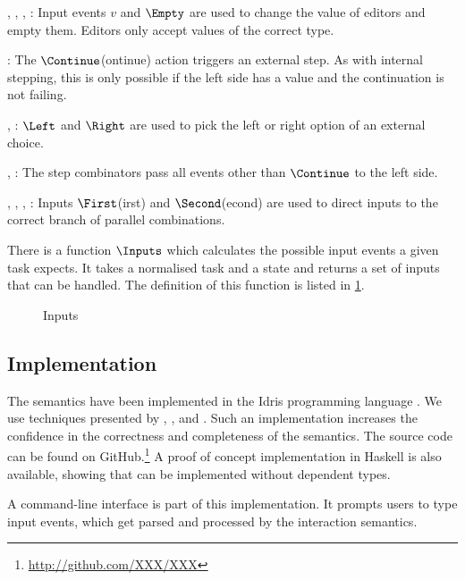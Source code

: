 ,
,
,
:
Input events $v$ and $\Empty$ are used to change the value of editors and empty them.
Editors only accept values of the correct type.

:
The $\Continue$(ontinue) action triggers an external step.
As with internal stepping, this is only possible if the left side has a value and the continuation is not failing.

,
:
$\Left$ and $\Right$ are used to pick the left or right option of an external choice.

,
:
The step combinators pass all events other than $\Continue$ to the left side.

,
,
,
:
Inputs $\First$(irst) and $\Second$(econd) are used to direct inputs to the correct branch of parallel combinations.

There is a function $\Inputs$ which calculates the possible input events a given task expects.
It takes a normalised task and a state and returns a set of inputs that can be handled.
The definition of this function is listed in \cref{fig:observation-input}.

\begin{figure}[h]
  \small
  \caption{Inputs} \label{fig:observation-input}
\end{figure}



\subsection{Implementation}

The semantics have been implemented in the Idris programming language \cite{journals/jfp/Brady13}.
We use techniques presented by \textcite{journals/entcs/JaskelioffGH11}, \textcite{journals/jfp/Swierstra08}, and \textcite{school/maktoberdorf/PeytonJones01}.
Such an implementation increases the confidence in the correctness and completeness of the semantics.
The source code can be found on GitHub.\footnote{\url{http://github.com/XXX/XXX}}
A proof of concept implementation in Haskell is also available, showing that \TOPHAT can be implemented without dependent types.

A command-line interface is part of this implementation.
It prompts users to type input events, which get parsed and processed by the interaction semantics.
